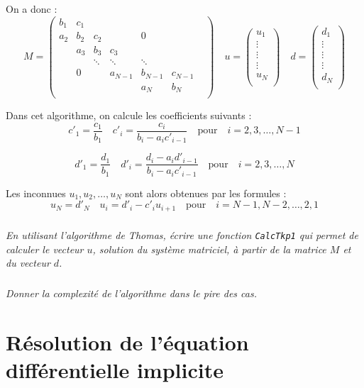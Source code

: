 \documentclass[10pt,fleqn]{article} %
\begin{document}
On a donc : 
$$
M = 
\begin{pmatrix}
b_1 & c_1 &  &  &  &  & \\
a_2 & b_2 & c_2 & &0 & &\\
      & a_3 & b_3 & c_3 & & & \\
& & \ddots & \ddots & \ddots & \\
& 0& & a_{N-1} & b_{N-1} & c_{N-1}\\
& & & & a_N & b_{N}\\
\end{pmatrix}
\quad 
u = \begin{pmatrix}
u_1 \\
\vdots \\
\vdots \\
\vdots  \\
u_N \\
\end{pmatrix}
\quad 
d = \begin{pmatrix}
d_1 \\
\vdots \\
\vdots \\
\vdots  \\
d_N \\
\end{pmatrix}
$$

Dans cet algorithme, on calcule les coefficients suivants : 
$$
c'_1 = \dfrac{c_1}{b_1} \quad c'_i = \dfrac{c_i}{b_i - a_i c'_{i-1}}  \quad \text{pour} \quad i=2,3,\ldots, N-1
$$

$$
d'_1 = \dfrac{d_1}{b_1} \quad d'_i = \dfrac{d_i-a_i d'_{i-1}}{b_i - a_i c'_{i-1}}  \quad \text{pour} \quad i=2, 3,\ldots, N
$$

Les inconnues $u_1, u_2, \ldots, u_N$ sont alors obtenues par les formules :
$$
u_N = d'_N \quad u_i = d'_i -c'_i u_{i+1} \quad  \text{pour} \quad i=N-1, N-2, \ldots, 2, 1
$$

\subparagraph{}
\textit{En utilisant l'algorithme de Thomas, écrire une fonction \texttt{CalcTkp1} qui permet de 
calculer le vecteur $u$, solution du système matriciel, à partir de la matrice $M$ et du vecteur $d$.}

\subparagraph{}
\textit{Donner la complexité de l'algorithme dans le pire des cas. }


\section{Résolution de l'équation différentielle implicite}
\end{document}
